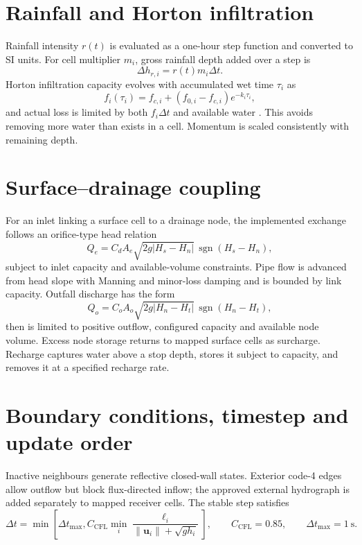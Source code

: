 \documentclass[11pt,a4paper,oneside]{report}
\begin{document}
\section{Rainfall and Horton infiltration}
Rainfall intensity $r(t)$ is evaluated as a one-hour step function and converted to SI
units. For cell multiplier $m_i$, gross rainfall depth added over a step is
\begin{equation}
 \Delta h_{r,i}=r(t)m_i\Delta t.
\end{equation}
Horton infiltration capacity evolves with accumulated wet time $\tau_i$ as
\begin{equation}
 f_i(\tau_i)=f_{c,i}+(f_{0,i}-f_{c,i})e^{-k_i\tau_i},
 \label{eq:horton}
\end{equation}
and actual loss is limited by both $f_i\Delta t$ and available water \cite{horton1933}.
This avoids removing more water than exists in a cell. Momentum is scaled consistently with
remaining depth.

\section{Surface--drainage coupling}
For an inlet linking a surface cell to a drainage node, the implemented exchange follows an
orifice-type head relation
\begin{equation}
 Q_e=C_d A_e\sqrt{2g\lvert H_s-H_n\rvert}\,
      \operatorname{sgn}(H_s-H_n),
\end{equation}
subject to inlet capacity and available-volume constraints. Pipe flow is advanced from
head slope with Manning and minor-loss damping and is bounded by link capacity. Outfall
discharge has the form
\begin{equation}
 Q_o=C_oA_o\sqrt{2g\lvert H_n-H_t\rvert}\,
      \operatorname{sgn}(H_n-H_t),
\end{equation}
then is limited to positive outflow, configured capacity and available node volume.
Excess node storage returns to mapped surface cells as surcharge. Recharge captures water
above a stop depth, stores it subject to capacity, and removes it at a specified recharge
rate.

\section{Boundary conditions, timestep and update order}
Inactive neighbours generate reflective closed-wall states. Exterior code-4 edges allow outflow but
block flux-directed inflow; the approved external hydrograph is added separately to mapped receiver
cells. The stable step satisfies
\begin{equation}
\Delta t =
\min\left[
\Delta t_{\max},
C_{\mathrm{CFL}}
\min_i
\frac{\ell_i}
{\|\mathbf{u}_i\|+\sqrt{g h_i}}
\right],
\qquad
C_{\mathrm{CFL}}=0.85,
\qquad
\Delta t_{\max}=1~\mathrm{s}.
\label{eq:cfl_timestep}
\end{equation}
\end{document}
